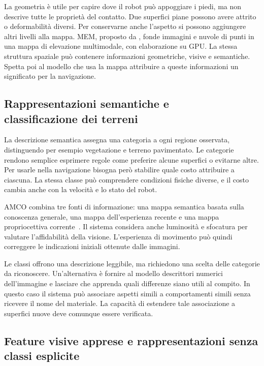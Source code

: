 La geometria è utile per capire dove il robot può appoggiare i piedi, ma non descrive tutte le proprietà del contatto. Due superfici piane possono avere attrito o deformabilità diversi. Per conservarne anche l'aspetto si possono aggiungere altri livelli alla mappa. MEM, proposto da \citet{Erni2023MEM}, fonde immagini e nuvole di punti in una mappa di elevazione multimodale, con elaborazione su GPU. La stessa struttura spaziale può contenere informazioni geometriche, visive e semantiche. Spetta poi al modello che usa la mappa attribuire a queste informazioni un significato per la navigazione.

\subsection[Rappresentazioni semantiche e classificazione dei terreni]{Rappresentazioni semantiche e\\classificazione dei terreni}

La descrizione semantica assegna una categoria a ogni regione osservata, distinguendo per esempio vegetazione e terreno pavimentato. Le categorie rendono semplice esprimere regole come preferire alcune superfici o evitarne altre. Per usarle nella navigazione bisogna però stabilire quale costo attribuire a ciascuna. La stessa classe può comprendere condizioni fisiche diverse, e il costo cambia anche con la velocità e lo stato del robot.

AMCO combina tre fonti di informazione: una mappa semantica basata sulla conoscenza generale, una mappa dell'esperienza recente e una mappa propriocettiva corrente~\citep{Elnoor2024AMCO}. Il sistema considera anche luminosità e sfocatura per valutare l'affidabilità della visione. L'esperienza di movimento può quindi correggere le indicazioni iniziali ottenute dalle immagini.

Le classi offrono una descrizione leggibile, ma richiedono una scelta delle categorie da riconoscere. Un'alternativa è fornire al modello descrittori numerici dell'immagine e lasciare che apprenda quali differenze siano utili al compito. In questo caso il sistema può associare aspetti simili a comportamenti simili senza ricevere il nome del materiale. La capacità di estendere tale associazione a superfici nuove deve comunque essere verificata.

\subsection{Feature visive apprese e rappresentazioni senza classi esplicite}

